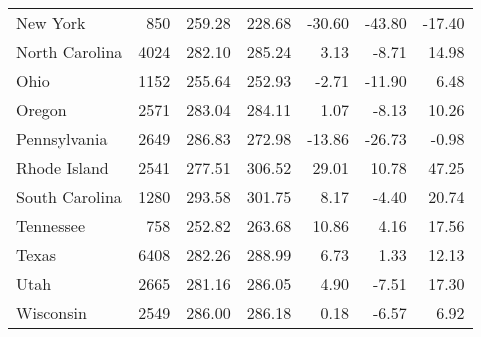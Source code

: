 \begin{table}[ht]
\begin{center}
\begin{tabular}{lrrrrrr}
  New York & 850 & 259.28 & 228.68 & -30.60 & -43.80 & -17.40 \\ 
  North Carolina & 4024 & 282.10 & 285.24 & 3.13 & -8.71 & 14.98 \\ 
  Ohio & 1152 & 255.64 & 252.93 & -2.71 & -11.90 & 6.48 \\ 
  Oregon & 2571 & 283.04 & 284.11 & 1.07 & -8.13 & 10.26 \\ 
  Pennsylvania & 2649 & 286.83 & 272.98 & -13.86 & -26.73 & -0.98 \\ 
  Rhode Island & 2541 & 277.51 & 306.52 & 29.01 & 10.78 & 47.25 \\ 
  South Carolina & 1280 & 293.58 & 301.75 & 8.17 & -4.40 & 20.74 \\ 
  Tennessee & 758 & 252.82 & 263.68 & 10.86 & 4.16 & 17.56 \\ 
  Texas & 6408 & 282.26 & 288.99 & 6.73 & 1.33 & 12.13 \\ 
  Utah & 2665 & 281.16 & 286.05 & 4.90 & -7.51 & 17.30 \\ 
  Wisconsin & 2549 & 286.00 & 286.18 & 0.18 & -6.57 & 6.92 \\ 
   \hline
\end{tabular}
\end{center}
\end{table}
